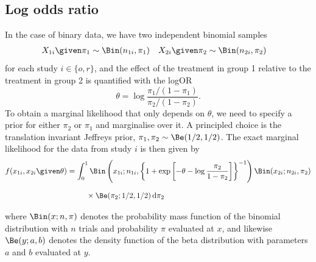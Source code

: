 \subsection{Log odds ratio}
In the case of binary data, we have two independent binomial samples
\begin{align*}
  &X_{1i} \given \pi_1 \sim \Bin(n_{1i}, \pi_1)&
  &X_{2i} \given \pi_2 \sim \Bin(n_{2i}, \pi_2)&
\end{align*}
for each study $i \in \{o, r\}$, and the effect of the treatment in group 1
relative to the treatment in group 2 is quantified with the logOR
$$\theta = \log \frac{\pi_1/(1 - \pi_1)}{\pi_2/(1 - \pi_2)}.$$
To obtain a marginal likelihood that only depends on $\theta$, we need to
specify a prior for either $\pi_2$ or $\pi_1$ and marginalise over it. A
principled choice is the translation invariant Jeffreys prior,
$\pi_1, \pi_2 \sim \Be(1/2, 1/2)$. The exact marginal likelihood for the data
from study $i$ is then given by
\begin{align}
  \label{eq1:binexact}
  f(x_{1i}, x_{2i} \given \theta)
  &= \int_0^1 \Bin\left(x_{1i}; n_{1i}, \left\{1 + \exp\left[-\theta - \log
    \frac{\pi_2}{1 - \pi_2}\right]\right\}^{-1}\right) \Bin(x_{2i}; n_{2i}, \pi_2)
  \nonumber
  \\ &\phantom{= \int_0^1}  \times \Be(\pi_2; 1/2, 1/2) \, \text{d} \pi_2
\end{align}
where $\Bin(x; n, \pi)$ denotes the probability mass function of the binomial
distribution with $n$ trials and probability $\pi$ evaluated at $x$, and
likewise $\Be(y; a, b)$ denotes the density function of the beta distribution
with parameters $a$ and $b$ evaluated at $y$.

